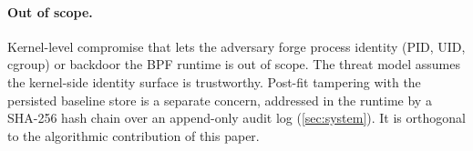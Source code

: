 \paragraph{Out of scope.} Kernel-level compromise that lets the
adversary forge process identity (PID, UID, cgroup) or backdoor the
BPF runtime is out of scope. The threat model assumes the kernel-side
identity surface is trustworthy. Post-fit tampering with the
persisted baseline store is a separate concern, addressed in the
runtime by a SHA-256 hash chain over an append-only audit log
(\cref{sec:system}). It is orthogonal to the algorithmic
contribution of this paper.
